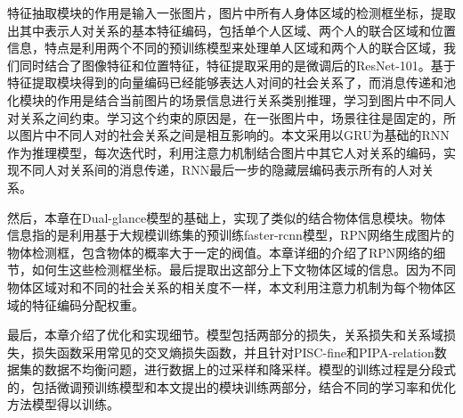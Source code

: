 特征抽取模块的作用是输入一张图片，图片中所有人身体区域的检测框坐标，提取出其中表示人对关系的基本特征编码，包括单个人区域、两个人的联合区域和位置信息，特点是利用两个不同的预训练模型来处理单人区域和两个人的联合区域，我们同时结合了图像特征和位置特征，特征提取采用的是微调后的ResNet-101。基于特征提取模块得到的向量编码已经能够表达人对间的社会关系了，而消息传递和池化模块的作用是结合当前图片的场景信息进行关系类别推理，学习到图片中不同人对关系之间约束。学习这个约束的原因是，在一张图片中，场景往往是固定的，所以图片中不同人对的社会关系之间是相互影响的。本文采用以GRU为基础的RNN 作为推理模型，每次迭代时，利用注意力机制结合图片中其它人对关系的编码，实现不同人对关系间的消息传递，RNN最后一步的隐藏层编码表示所有的人对关系。

然后，本章在Dual-glance模型的基础上，实现了类似的结合物体信息模块。物体信息指的是利用基于大规模训练集的预训练faster-rcnn模型，RPN网络生成图片的物体检测框，包含物体的概率大于一定的阀值。本章详细的介绍了RPN网络的细节，如何生这些检测框坐标。最后提取出这部分上下文物体区域的信息。因为不同物体区域对和不同的社会关系的相关度不一样，本文利用注意力机制为每个物体区域的特征编码分配权重。

最后，本章介绍了优化和实现细节。模型包括两部分的损失，关系损失和关系域损失，损失函数采用常见的交叉熵损失函数，并且针对PISC-fine和PIPA-relation数据集的数据不均衡问题，进行数据上的过采样和降采样。模型的训练过程是分段式的，包括微调预训练模型和本文提出的模块训练两部分，结合不同的学习率和优化方法模型得以训练。




